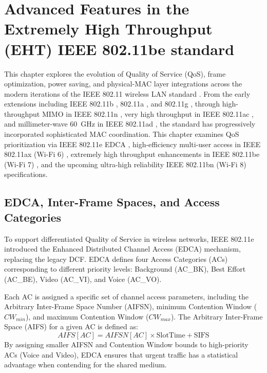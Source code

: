 \chapter{Advanced Features in  the Extremely High Throughput (EHT) IEEE 802.11be standard}
\label{sec:chapter2}

This chapter explores the evolution of Quality of Service (QoS), frame optimization, power saving, and physical-MAC layer integrations across the modern iterations of the IEEE 802.11 wireless LAN standard \cite{ieee80211_2020}. From the early extensions including IEEE 802.11b \cite{ieee80211b_1999}, 802.11a \cite{ieee80211a_1999}, and 802.11g \cite{ieee80211g_2003}, through high-throughput MIMO in IEEE 802.11n \cite{ieee80211n_2009}, very high throughput in IEEE 802.11ac \cite{ieee80211ac_2013}, and millimeter-wave 60~GHz in IEEE 802.11ad \cite{ieee80211ad_2012}, the standard has progressively incorporated sophisticated MAC coordination. This chapter examines QoS prioritization via IEEE 802.11e EDCA \cite{ieee80211e_2005}, high-efficiency multi-user access in IEEE 802.11ax (Wi-Fi 6) \cite{ieee80211ax_2021}, extremely high throughput enhancements in IEEE 802.11be (Wi-Fi 7) \cite{ieee80211be_2024}, and the upcoming ultra-high reliability IEEE 802.11bn (Wi-Fi 8) specifications.

\section{EDCA, Inter-Frame Spaces, and Access Categories}
To support differentiated Quality of Service in wireless networks, IEEE 802.11e introduced the Enhanced Distributed Channel Access (EDCA) mechanism, replacing the legacy DCF. EDCA defines four Access Categories (ACs) corresponding to different priority levels: Background (AC\_BK), Best Effort (AC\_BE), Video (AC\_VI), and Voice (AC\_VO).

Each AC is assigned a specific set of channel access parameters, including the Arbitrary Inter-Frame Space Number (AIFSN), minimum Contention Window ($CW_{min}$), and maximum Contention Window ($CW_{max}$). The Arbitrary Inter-Frame Space (AIFS) for a given AC is defined as:
\begin{equation}
    AIFS[AC] = AIFSN[AC] \times \text{SlotTime} + \text{SIFS}
\end{equation}
By assigning smaller AIFSN and Contention Window bounds to high-priority ACs (Voice and Video), EDCA ensures that urgent traffic has a statistical advantage when contending for the shared medium.

